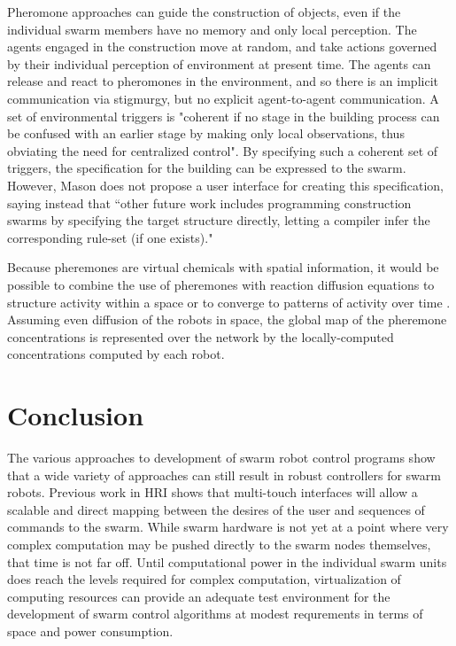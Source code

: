 \documentclass[]{article}
\begin{document}
Pheromone approaches can guide the construction of objects, even if the individual swarm members have no memory and only local perception\cite{mason2003programming}. 
The agents engaged in the construction move at random, and take actions governed by their individual perception of environment at present time. 
The agents can release and react to pheromones in the environment, and so there is an implicit communication via stigmurgy, but no explicit agent-to-agent communication. 
A set of environmental triggers is "coherent if no stage in the building process can be confused with an earlier stage by making only local observations, thus obviating the need for centralized control".   
By specifying such a coherent set of triggers, the specification for the building can be expressed to the swarm. 
However, Mason does not propose a user interface for creating this specification, saying instead that ``other future work includes programming construction swarms by specifying the target structure directly, letting a compiler infer the corresponding rule-set (if one exists)."

Because pheremones are virtual chemicals with spatial information, it would be possible to combine the use of pheremones with reaction diffusion equations to structure activity within a space or to converge to patterns of activity over time \cite{turing1952chemical}. 
Assuming even diffusion of the robots in space, the global map of the pheremone concentrations is represented over the network by the locally-computed concentrations computed by each robot.   

\section{Conclusion}

The various approaches to development of swarm robot control programs show that a wide variety of approaches can still result in robust controllers for swarm robots. 
Previous work in HRI shows that multi-touch interfaces will allow a scalable and direct mapping between the desires of the user and sequences of commands to the swarm. 
While swarm hardware is not yet at a point where very complex computation may be pushed directly to the swarm nodes themselves, that time is not far off. 
Until computational power in the individual swarm units does reach the levels required for complex computation, virtualization of computing resources can provide an adequate test environment for the development of swarm control algorithms at modest requrements in terms of space and power consumption. 



\end{document}
